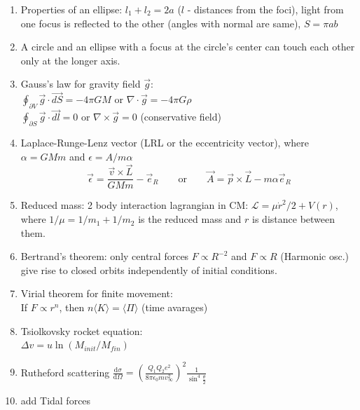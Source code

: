 \documentclass{article}
\renewcommand\d{\mathrm d}
\begin{document}
\begin{multicols}{3}
\begin{enumerate}
            \item Properties of an ellipse: $l_1+l_2=2a$ ($l$ - distances from the foci), light from one focus is reflected to the other (angles with normal are same), $S=\pi ab$
            \item A circle and an ellipse with a focus at the circle's center can touch each other only at the longer axis.
            \item Gauss's law for gravity field $\vec g$:\\
            $\oint_{\partial V}\vec g\cdot\vec{dS}=-4\pi GM$ or $\nabla\cdot\vec g=-4\pi G\rho$\\
            $\oint_{\partial S}\vec g\cdot\vec{dl}=0$ or $\nabla\times\vec g=0$ (conservative field)
            \item Laplace-Runge-Lenz vector (LRL or the eccentricity vector), where $\alpha=GMm$ and $\epsilon=A/m\alpha$ $$\vec\epsilon=\frac{\vec v\times\vec L}{GMm}-\vec e_R\qquad\text{or}\qquad\vec A=\vec p\times\vec L-m\alpha\vec e_R$$
            \item Reduced mass: 2 body interaction lagrangian in CM: $\mathcal L=\mu\dot r^2/2+V(r)$, where $1/\mu=1/m_1+1/m_2$ is the reduced mass and $r$ is distance between them.
            \item Bertrand's theorem: only central forces $F\propto R^{-2}$ and $F\propto R$ (Harmonic osc.) give rise to closed orbits independently of initial conditions.
            \item Virial theorem for finite movement:\\
            If $F \propto r^n$, then $n\langle K \rangle = \langle \Pi \rangle$ (time avarages)
            \item Tsiolkovsky rocket equation:\\ $\Delta v=u\ln(M_{init}/M_{fin})$
            \item Rutheford scattering $\frac{\d\sigma }{\d\Omega}=\left(\frac {Q_1Q_2e^2}{8\pi\epsilon_0mv_\infty^2}\right)^2\frac{1}{\sin^4\frac{\theta }{2}}$
            \item {\color{red}add Tidal forces}
        \end{enumerate}

        \begin{enumerate}


\end{enumerate}
\end{multicols}
\end{document}
